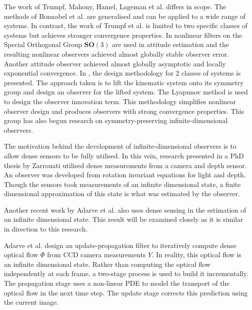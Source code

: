 The work of Trumpf, Mahony, Hamel, Lageman et al. differs in scope. The methods of Bonnabel et al. are generalised and can be applied to a wide range of systems. In contrast, the work of Trumpf et al. is limited to two specific classes of systems but achieves stronger convergence properties.
In \cite{mahony2009nonlinear} nonlinear filters on the Special Orthogonal Group $\mathbf{SO}(3)$ are used in attitude estimation and the resulting nonlinear observers achieved almost globally stable observer error.
Another attitude observer \cite{trumpf2012analysis} achieved almost globally asymptotic and locally exponential convergence.
In \cite{mahony2013observers}, the design methodology for 2 classes of systems is presented. The approach taken is to lift the kinematic system onto its symmetry group and design an observer for the lifted system. The Lyapunov method is used to design the observer innovation term. This methodology simplifies nonlinear observer design and produces observers with strong convergence properties. This group has also begun research  on symmetry-preserving infinite-dimensional observers.

The motivation behind the development of infinite-dimensional observers is to allow dense sensors to be fully utilised. In this vein, research presented in a PhD thesis by Zarrouati \cite{zarrouati2013augmented} utilised dense measurements from a camera and depth sensor. An observer was developed from rotation invariant equations for light and depth. Though the sensors took measurements of an infinite dimensional state, a finite dimensional approximation of this state is what was estimated by the observer.

Another recent work by Adarve et al.\cite{adarvefiltering} also uses dense sensing in the estimation of an infinite dimensional state. This result will be examined closely as it is similar in direction to this research.

Adarve et al. design an update-propagation filter to iteratively compute dense optical flow $\Phi$ from CCD camera measurements $Y$. In reality, this optical flow is an infinite dimensional state. Rather than computing the optical flow independently at each frame, a two-stage process is used to build it incrementally. The propagation stage uses a non-linear PDE to model the transport of the optical flow in the next time step. The update stage corrects this prediction using the current image.


